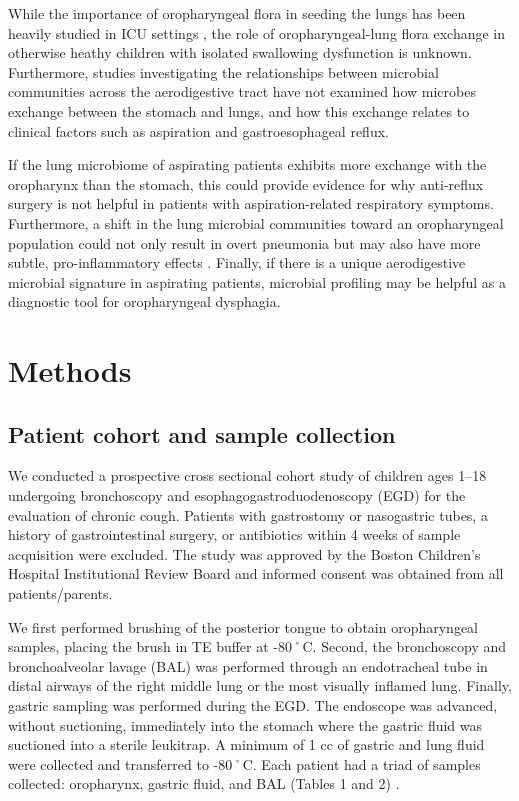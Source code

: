 \documentclass{article}
\begin{document}
While the importance of oropharyngeal flora in seeding the lungs has been heavily studied in ICU settings \cite{tantipong2008decontamination,koeman2006decontamination,hu2010pseudo}, the role of oropharyngeal-lung flora exchange in otherwise heathy children with isolated swallowing dysfunction is unknown. 
Furthermore, studies investigating the relationships between microbial communities across the aerodigestive tract have not examined how microbes exchange between the stomach and lungs, and how this exchange relates to clinical factors such as aspiration and gastroesophageal reflux.

If the lung microbiome of aspirating patients exhibits more exchange with the oropharynx than the stomach, this could provide evidence for why anti-reflux surgery is not helpful in patients with aspiration-related respiratory symptoms. 
Furthermore, a shift in the lung microbial communities toward an oropharyngeal population could not only result in overt pneumonia but may also have more subtle, pro-inflammatory effects \cite{segal-2016-inflammation}. 
Finally, if there is a unique aerodigestive microbial signature in aspirating patients, microbial profiling may be helpful as a diagnostic tool for oropharyngeal dysphagia.

\section{Methods}

\subsection{Patient cohort and sample collection}

We conducted a prospective cross sectional cohort study of children ages 1--18 undergoing bronchoscopy and esophagogastroduodenoscopy (EGD) for the evaluation of chronic cough. 
Patients with gastrostomy or nasogastric tubes, a history of gastrointestinal surgery, or antibiotics within 4 weeks of sample acquisition were excluded. 
The study was approved by the Boston Children's Hospital Institutional Review Board and informed consent was obtained from all patients/parents.

We first performed brushing of the posterior tongue to obtain oropharyngeal samples, placing the brush in TE buffer at -80˚C. 
Second, the bronchoscopy and bronchoalveolar lavage (BAL) was performed through an endotracheal tube in distal airways of the right middle lung or the most visually inflamed lung.
Finally, gastric sampling was performed during the EGD. 
The endoscope was advanced, without suctioning, immediately into the stomach where the gastric fluid was suctioned into a sterile leukitrap. 
A minimum of 1 cc of gastric and lung fluid were collected and transferred to -80˚C. 
Each patient had a triad of samples collected: oropharynx, gastric fluid, and BAL (Tables 1 and 2) \cite{rosen2015ppi}. 
\end{document}
